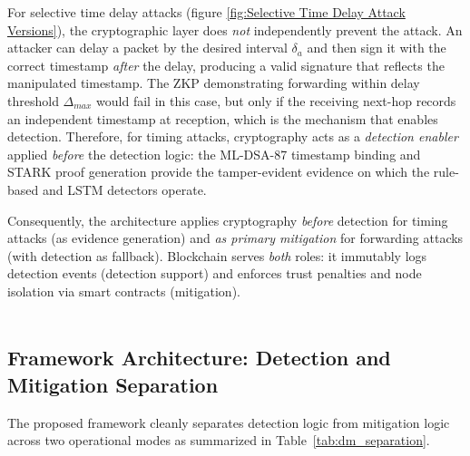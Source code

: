 \documentclass[12pt, a4paper]{report}
\begin{document}
For selective time delay attacks (figure \ref{fig:Selective Time Delay Attack Versions}), the cryptographic
layer does \emph{not} independently prevent the attack. An attacker can
delay a packet by the desired interval $\delta_a$ and then sign it with
the correct timestamp \emph{after} the delay, producing a valid
signature that reflects the manipulated timestamp. The ZKP demonstrating
forwarding within delay threshold $\Delta_{max}$ would fail in this
case, but only if the receiving next-hop records an independent
timestamp at reception, which is the mechanism that enables detection.
Therefore, for timing attacks, cryptography acts as a \emph{detection
enabler} applied \emph{before} the detection logic: the ML-DSA-87 timestamp binding and STARK proof generation provide the tamper-evident evidence on which
the rule-based and LSTM detectors operate.

Consequently, the architecture applies cryptography \emph{before}
detection for timing attacks (as evidence generation) and \emph{as
primary mitigation} for forwarding attacks (with detection as fallback).
Blockchain serves \emph{both} roles: it immutably logs detection events
(detection support) and enforces trust penalties and node isolation via
smart contracts (mitigation).
\\ \\




\subsection{Framework Architecture: Detection and Mitigation Separation}
\label{sec:framework_arch}


The proposed framework cleanly separates detection logic from mitigation
logic across two operational modes as summarized in Table~\ref{tab:dm_separation}.
\end{document}
